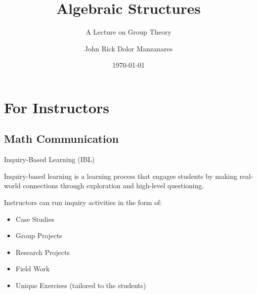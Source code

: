 \documentclass{beamer}
\title{Algebraic Structures}
\subtitle{A Lecture on Group Theory}
\author{John Rick Dolor Manzanares}
\institute{Baguio City, Philippines}
\date{\today}
\begin{document}
\begin{frame}
\maketitle
\end{frame}

\section*{For Instructors}

\subsection{Math Communication}

\begin{frame}{Inquiry-Based Learning (IBL)}
\justifying
\begin{definition}
    \justifying
    Inquiry-based learning is a learning process that engages students by making real-world connections through exploration and high-level questioning.
\end{definition}
Instructors can run inquiry activities in the form of:
\begin{itemize}
    \item Case Studies
    \item Group Projects
    \item Research Projects
    \item Field Work
    \item Unique Exercises (tailored to the students)
\end{itemize}
\end{frame}
\end{document}
